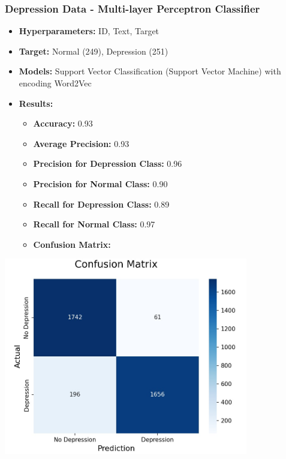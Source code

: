 \documentclass[a4paper,12pt]{article}
\begin{document}
\vspace{0.5cm} %

\subsubsection{Depression Data - Multi-layer Perceptron Classifier}
\begin{itemize}
    \item \textbf{Hyperparameters:} ID, Text, Target
    \item \textbf{Target:} Normal (249), Depression (251)
    \item \textbf{Models:} Support Vector Classification (Support Vector Machine) with encoding Word2Vec
    \item \textbf{Results:}
    \begin{itemize}
        \item \textbf{Accuracy:} 0.93
        \item \textbf{Average Precision:} 0.93
        \item \textbf{Precision for Depression Class:} 0.96
        \item \textbf{Precision for Normal Class:} 0.90
        \item \textbf{Recall for Depression Class:} 0.89
        \item \textbf{Recall for Normal Class:} 0.97
        \item \textbf{Confusion Matrix:}
    \end{itemize}
\end{itemize}

\begin{center}
    \includegraphics[width=0.8\textwidth]{Depression-Data-MLPClassifier.jpg} %
\end{center}
\end{document}
